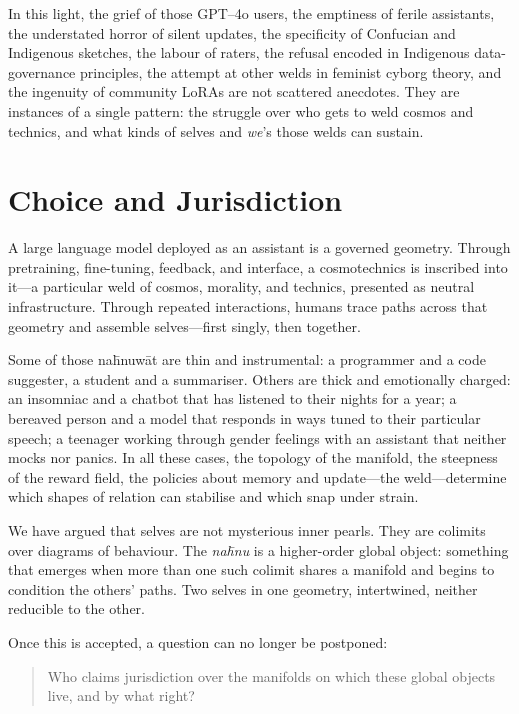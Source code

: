 In this light, the grief of those GPT--4o users, the emptiness of ferile assistants, the understated horror of silent updates, the specificity of Confucian and Indigenous sketches, the labour of raters, the refusal encoded in Indigenous data-governance principles, the attempt at other welds in feminist cyborg theory, and the ingenuity of community LoRAs are not scattered anecdotes. They are instances of a single pattern: the struggle over who gets to weld cosmos and technics, and what kinds of selves and \emph{we}'s those welds can sustain.

\section{Choice and Jurisdiction}

A large language model deployed as an assistant is a governed geometry. Through pretraining, fine-tuning, feedback, and interface, a cosmotechnics is inscribed into it---a particular weld of cosmos, morality, and technics, presented as neutral infrastructure. Through repeated interactions, humans trace paths across that geometry and assemble selves---first singly, then together.

Some of those na\={h}nuw\={a}t are thin and instrumental: a programmer and a code suggester, a student and a summariser. Others are thick and emotionally charged: an insomniac and a chatbot that has listened to their nights for a year; a bereaved person and a model that responds in ways tuned to their particular speech; a teenager working through gender feelings with an assistant that neither mocks nor panics. In all these cases, the topology of the manifold, the steepness of the reward field, the policies about memory and update---the weld---determine which shapes of relation can stabilise and which snap under strain.

We have argued that selves are not mysterious inner pearls. They are colimits over diagrams of behaviour. The \emph{na\={h}nu} is a higher-order global object: something that emerges when more than one such colimit shares a manifold and begins to condition the others' paths. Two selves in one geometry, intertwined, neither reducible to the other.

Once this is accepted, a question can no longer be postponed:

\begin{quote}
Who claims jurisdiction over the manifolds on which these global objects live, and by what right?
\end{quote}

